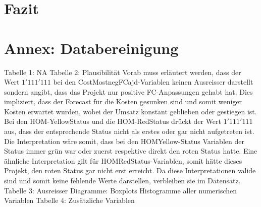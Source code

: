 
\section{Fazit}
\section*{Annex: Databereinigung}
Tabelle 1: NA
Tabelle 2: Plausibilität
Vorab muss erläutert werden, dass der Wert $1'111'111$ bei den CostMostnegFCajd-Variablen keinen Ausreisser darstellt sondern angibt, dass das Projekt nur positive FC-Anpassungen gehabt hat. Dies impliziert, dass der Forecast für die Kosten gesunken sind und somit weniger Kosten erwartet wurden, wobei der Umsatz konstant geblieben oder gestiegen ist. Bei den HOM-YellowStatus und die HOM-RedStatus drückt der Wert $1'111'111$ aus, dass der entsprechende Status nicht als erstes oder gar nicht aufgetreten ist. Die Interpretation wäre somit, dass bei den HOMYellow-Status Variablen der Status immer grün war oder zuerst respektive direkt den roten Status hatte. Eine ähnliche Interpretation gilt für HOMRedStatus-Variablen, somit hätte dieses Projekt, den roten Status gar nicht erst erreicht. Da diese Interpretationen valide sind und somit keine fehlende Werte darstellen, verbleiben sie im Datensatz. 
Tabelle 3: Ausreisser
Diagramme: Boxplots Histogramme aller numerischen Variablen
Tabelle 4: Zusätzliche Variablen
